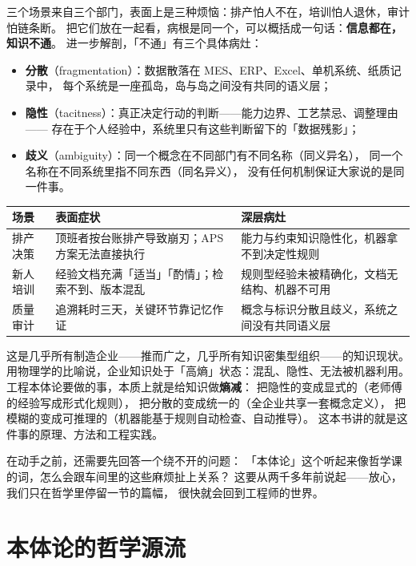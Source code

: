 三个场景来自三个部门，表面上是三种烦恼：排产怕人不在，培训怕人退休，审计怕链条断。
把它们放在一起看，病根是同一个，可以概括成一句话：\textbf{信息都在，知识不通}。
进一步解剖，「不通」有三个具体病灶：

\begin{itemize}
\item \textbf{分散}（fragmentation）：数据散落在 MES、ERP、Excel、单机系统、纸质记录中，
      每个系统是一座孤岛，岛与岛之间没有共同的语义层；
\item \textbf{隐性}（tacitness）：真正决定行动的判断——能力边界、工艺禁忌、调整理由——
      存在于个人经验中，系统里只有这些判断留下的「数据残影」；
\item \textbf{歧义}（ambiguity）：同一个概念在不同部门有不同名称（同义异名），
      同一个名称在不同系统里指不同东西（同名异义），
      没有任何机制保证大家说的是同一件事。
\end{itemize}

\begin{center}
\begin{tabularx}{\linewidth}{@{}lXX@{}}
\toprule
\textbf{场景} & \textbf{表面症状} & \textbf{深层病灶} \\
\midrule
排产决策 & 顶班者按台账排产导致崩刃；APS 方案无法直接执行 & 能力与约束知识隐性化，机器拿不到决定性规则 \\
新人培训 & 经验文档充满「适当」「酌情」；检索不到、版本混乱 & 规则型经验未被精确化，文档无结构、机器不可用 \\
质量审计 & 追溯耗时三天，关键环节靠记忆作证 & 概念与标识分散且歧义，系统之间没有共同语义层 \\
\bottomrule
\end{tabularx}
\end{center}

这是几乎所有制造企业——推而广之，几乎所有知识密集型组织——的知识现状。
用物理学的比喻说，企业知识处于「高熵」状态：混乱、隐性、无法被机器利用。
工程本体论要做的事，本质上就是给知识做\textbf{熵减}：
把隐性的变成显式的（老师傅的经验写成形式化规则），
把分散的变成统一的（全企业共享一套概念定义），
把模糊的变成可推理的（机器能基于规则自动检查、自动推导）。
这本书讲的就是这件事的原理、方法和工程实践。

在动手之前，还需要先回答一个绕不开的问题：
「本体论」这个听起来像哲学课的词，怎么会跟车间里的这些麻烦扯上关系？
这要从两千多年前说起——放心，我们只在哲学里停留一节的篇幅，
很快就会回到工程师的世界。

\section{本体论的哲学源流}

